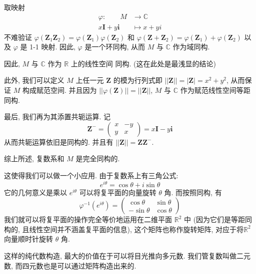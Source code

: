 \documentclass[UTF8]{book}
\begin{document}
\begin{example}
    取映射 
    $$ \begin{aligned}
        \varphi: \quad\quad M & \to \mathbb{C} \\
        x\boldsymbol{I}+y\boldsymbol{i} &\mapsto 
        x+yi
    \end{aligned}$$
    不难验证 
    $\varphi(\boldsymbol{Z}_1\boldsymbol{Z}_2) = 
    \varphi(\boldsymbol{Z}_1)\varphi(\boldsymbol{Z}_2)$ 
    和 $\varphi(\boldsymbol{Z}+\boldsymbol{Z}_2) = 
    \varphi(\boldsymbol{Z}_1)+\varphi(\boldsymbol{Z}_2)$ 
    以及 $\varphi$ 是 1-1 映射. 
    因此, $\varphi$ 是一个环同构, 
    从而 $M$ 与 $\mathbb{C}$ 作为域同构. 
    
    因此, $M$ 与 $\mathbb{C}$ 作为 $\mathbb{R}$ 上的线性空间
    同构. (这在此处是最浅显的结论)

    此外, 我们可以定义 $M$ 上任一元 $\boldsymbol{Z}$ 
    的模为行列式即 $||\boldsymbol{Z}||=|\boldsymbol{Z}|=x^2+y^2$, 
    从而保证 $M$ 构成赋范空间. 
    并且因为 
    $||\varphi(\boldsymbol{Z})|| = ||\boldsymbol{Z}||$, 
    $M$ 与 $\mathbb{C}$ 作为赋范线性空间等距同构. 

    最后, 我们再为其添置共轭运算. 
    记 $$\boldsymbol{Z}^{-} = \begin{pmatrix} x & -y \\y & x
    \end{pmatrix}=x\boldsymbol{I}-y\boldsymbol{i}$$ 
    从而共轭运算依旧是同构的. 
    并且有 $||\boldsymbol{Z}||=\boldsymbol{Z}\boldsymbol{Z}^-$. 

    综上所述, 复数系和 $M$ 是完全同构的. 

    这使得我们可以做一个小应用. 
    由于复数系上有三角公式: 
    $$ e^{i\theta} = \cos\theta + i \sin \theta $$ 
    它的几何意义是乘以 $e^{i\theta}$ 可以将复平面的向量旋转 $\theta$ 
    角. 而按照同构, 有 
    $$ \varphi^{-1}(e^{i\theta}) = 
    \begin{pmatrix}
        \cos\theta & \sin\theta \\
        -\sin\theta & \cos\theta 
    \end{pmatrix}$$ 
    我们就可以将复平面的操作完全等价地运用在二维平面 $\mathbb{R}^2$ 
    中 (因为它们是等距同构的, 且线性空间并不涵盖复平面的信息), 
    这个矩阵也称作旋转矩阵, 对应于将$\mathbb{R}^2$ 向量顺时针旋转 
    $\theta$ 角. 
\end{example} 

\begin{remark}
    这样的纯代数构造, 最大的价值在于可以将目光推向多元数. 
    我们管复数叫做二元数, 而四元数也是可以通过矩阵构造出来的. 
\end{remark}
\end{document}
